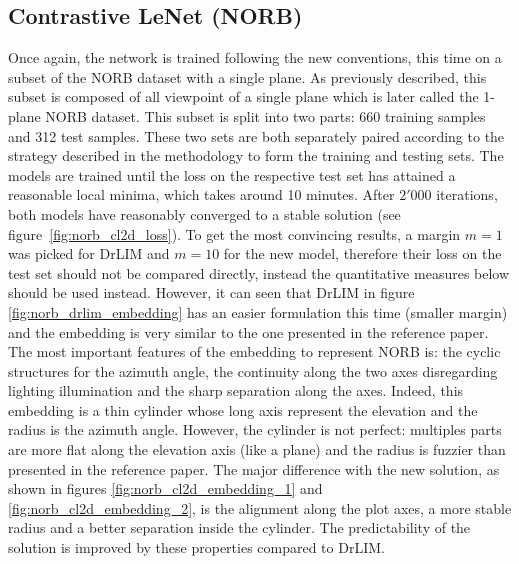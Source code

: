 \documentclass[a4paper,12pt]{report}
\begin{document}
\subsection{Contrastive LeNet (NORB)}
Once again, the network is trained following the new conventions, this time on a subset of the NORB dataset with a single plane.
As previously described, this subset is composed of all viewpoint of a single plane which is later called the 1-plane NORB dataset.
This subset is split into two parts: 660 training samples and 312 test samples.
These two sets are both separately paired according to the strategy described in the methodology to form the training and testing sets.
The models are trained until the loss on the respective test set has attained a reasonable local minima, which takes around 10 minutes.
After $2'000$ iterations, both models have reasonably converged to a stable solution (see figure~\ref{fig:norb_cl2d_loss}).
To get the most convincing results, a margin $m=1$ was picked for DrLIM and $m=10$ for the new model, therefore their loss on the test set should not be compared directly, instead the quantitative measures below should be used instead.
However, it can seen that DrLIM in figure \ref{fig:norb_drlim_embedding} has an easier formulation this time (smaller margin) and the embedding is very similar to the one presented in the reference paper.
The most important features of the embedding to represent NORB is: the cyclic structures for the azimuth angle, the continuity along the two axes disregarding lighting illumination and the sharp separation along the axes.
Indeed, this embedding is a thin cylinder whose long axis represent the elevation and the radius is the azimuth angle.
However, the cylinder is not perfect: multiples parts are more flat along the elevation axis (like a plane) and the radius is fuzzier than presented in the reference paper.
The major difference with the new solution, as shown in figures \ref{fig:norb_cl2d_embedding_1} and \ref{fig:norb_cl2d_embedding_2}, is the alignment along the plot axes, a more stable radius and a better separation inside the cylinder.
The predictability of the solution is improved by these properties compared to DrLIM.
\end{document}
